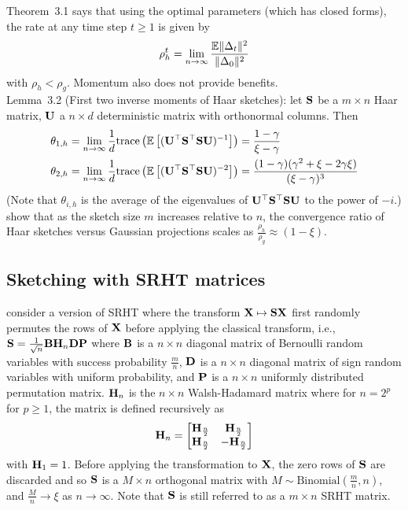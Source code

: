 \documentclass[10pt]{article}
\begin{document}
Theorem~3.1 says that using the optimal parameters (which has closed forms), the rate at any time step $t\geq1$ is given by
\[
\rho_h^t = \lim_{n\rightarrow\infty}\frac{\mathbb{E}\|\Delta_t\|^2}{\|\Delta_0\|^2}
\]
with $\rho_h<\rho_g$. Momentum also does not provide benefits.
\\

Lemma~3.2 (First two inverse moments of Haar sketches): let $\mathbf{S}$ be a $m\times n$ Haar matrix, $\mathbf{U}$ a $n\times d$ deterministic matrix with orthonormal columns. Then
\begin{align*}
\theta_{1,h} &= \lim_{n\rightarrow\infty} \frac{1}{d} \mathrm{trace}\left(\mathbb{E}\left[(\mathbf{U}^\top\mathbf{S}^\top\mathbf{S}\mathbf{U})^{-1}\right]\right) = \frac{1-\gamma}{\xi-\gamma} \\
\theta_{2,h} &= \lim_{n\rightarrow\infty} \frac{1}{d} \mathrm{trace}\left(\mathbb{E}\left[(\mathbf{U}^\top\mathbf{S}^\top\mathbf{S}\mathbf{U})^{-2}\right]\right) = \frac{(1-\gamma)(\gamma^2+\xi-2\gamma\xi)}{(\xi-\gamma)^3}
\end{align*}
(Note that $\theta_{i,h}$ is the average of the eigenvalues of $\mathbf{U}^\top\mathbf{S}^\top\mathbf{S}\mathbf{U}$ to the power of $-i$.)
\\

\citet{Lacotte:2020} show that as the sketch size $m$ increases relative to $n$, the convergence ratio of Haar sketches versus Gaussian projections scales as $\frac{\rho_h}{\rho_g}\approx (1-\xi)$.


\subsection{Sketching with SRHT matrices}

\citet{Lacotte:2020} consider a version of SRHT where the transform $\mathbf{X}\mapsto\mathbf{S}\mathbf{X}$ first randomly permutes the rows of $\mathbf{X}$ before applying the classical transform, i.e., $\mathbf{S}=\frac{1}{\sqrt{n}}\mathbf{B}\mathbf{H}_n\mathbf{D}\mathbf{P}$ where $\mathbf{B}$ is a $n\times n$ diagonal matrix of \iid Bernoulli random variables with success probability $\frac{m}{n}$, $\mathbf{D}$ is a $n\times n$ diagonal matrix of \iid sign random variables with uniform probability, and $\mathbf{P}$ is a $n\times n$ uniformly distributed permutation matrix. $\mathbf{H}_n$ is the $n\times n$ Walsh-Hadamard matrix where for $n=2^p$ for $p\geq1$, the matrix is defined recursively as
\[
\mathbf{H}_n = \begin{bmatrix}
\mathbf{H}_\frac{n}{2} & \mathbf{H}_\frac{n}{2} \\
\mathbf{H}_\frac{n}{2} & -\mathbf{H}_\frac{n}{2}
\end{bmatrix}
\]
with $\mathbf{H}_1=1$. Before applying the transformation to $\mathbf{X}$, the zero rows of $\mathbf{S}$ are discarded and so $\mathbf{S}$ is a $M\times n$ orthogonal matrix with $M\sim\mathrm{Binomial}(\frac{m}{n},n)$, and $\frac{M}{n}\rightarrow\xi$ as $n\rightarrow\infty$. Note that $\mathbf{S}$ is still referred to as a $m\times n$ SRHT matrix.
\\
\end{document}
